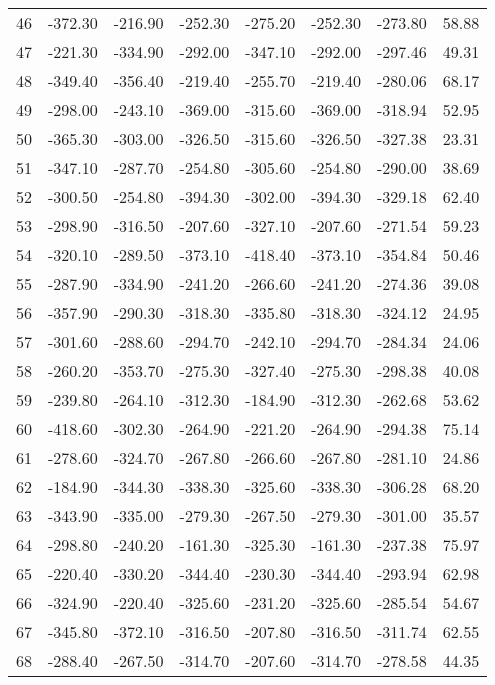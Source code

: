 \begin{longtable}{rrrrrrrr}
46 & -372.30 & -216.90 & -252.30 & -275.20 & -252.30 & -273.80 & 58.88  \\
47 & -221.30 & -334.90 & -292.00 & -347.10 & -292.00 & -297.46 & 49.31  \\
48 & -349.40 & -356.40 & -219.40 & -255.70 & -219.40 & -280.06 & 68.17  \\
49 & -298.00 & -243.10 & -369.00 & -315.60 & -369.00 & -318.94 & 52.95  \\
50 & -365.30 & -303.00 & -326.50 & -315.60 & -326.50 & -327.38 & 23.31  \\
51 & -347.10 & -287.70 & -254.80 & -305.60 & -254.80 & -290.00 & 38.69  \\
52 & -300.50 & -254.80 & -394.30 & -302.00 & -394.30 & -329.18 & 62.40  \\
53 & -298.90 & -316.50 & -207.60 & -327.10 & -207.60 & -271.54 & 59.23  \\
54 & -320.10 & -289.50 & -373.10 & -418.40 & -373.10 & -354.84 & 50.46  \\
55 & -287.90 & -334.90 & -241.20 & -266.60 & -241.20 & -274.36 & 39.08  \\
56 & -357.90 & -290.30 & -318.30 & -335.80 & -318.30 & -324.12 & 24.95  \\
57 & -301.60 & -288.60 & -294.70 & -242.10 & -294.70 & -284.34 & 24.06  \\
58 & -260.20 & -353.70 & -275.30 & -327.40 & -275.30 & -298.38 & 40.08  \\
59 & -239.80 & -264.10 & -312.30 & -184.90 & -312.30 & -262.68 & 53.62  \\
60 & -418.60 & -302.30 & -264.90 & -221.20 & -264.90 & -294.38 & 75.14  \\
61 & -278.60 & -324.70 & -267.80 & -266.60 & -267.80 & -281.10 & 24.86  \\
62 & -184.90 & -344.30 & -338.30 & -325.60 & -338.30 & -306.28 & 68.20  \\
63 & -343.90 & -335.00 & -279.30 & -267.50 & -279.30 & -301.00 & 35.57  \\
64 & -298.80 & -240.20 & -161.30 & -325.30 & -161.30 & -237.38 & 75.97  \\
65 & -220.40 & -330.20 & -344.40 & -230.30 & -344.40 & -293.94 & 62.98  \\
66 & -324.90 & -220.40 & -325.60 & -231.20 & -325.60 & -285.54 & 54.67  \\
67 & -345.80 & -372.10 & -316.50 & -207.80 & -316.50 & -311.74 & 62.55  \\
68 & -288.40 & -267.50 & -314.70 & -207.60 & -314.70 & -278.58 & 44.35  \\

\end{longtable}
